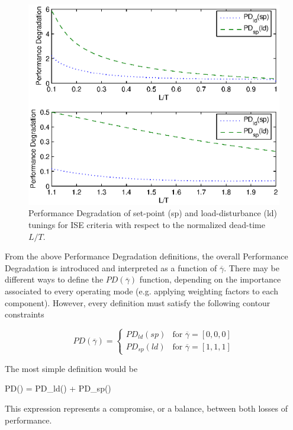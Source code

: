 \begin{figure}[h!]
    \begin{center}
        \includegraphics[width=0.8\linewidth]{PerfDeg.eps}
        \caption{Performance Degradation of set-point (sp) and load-disturbance (ld) tunings for ISE criteria with respect to the
        normalized dead-time $L/T$.}
        \label{PerfDegradation}
    \end{center}
\end{figure}

From the above Performance Degradation definitions, the overall
Performance Degradation is introduced and interpreted as a
function of $\overline{\gamma}$. There may be different ways to
define the $PD(\overline{\gamma})$ function, depending on the
importance associated to every operating mode (e.g. applying
weighting factors to each component). However, every definition
must satisfy the following contour constraints

\begin{displaymath}
PD(\overline{\gamma}) = \left \{ \begin{array}{ll} PD_{ld}(sp) &
\textrm{for  $\overline{\gamma}=\left[0,
0, 0 \right]$}\\
PD_{sp}(ld) & \textrm{for  $\overline{\gamma}=\left[1, 1, 1
\right]$}
\end{array} \right.
\end{displaymath}

The most simple definition would be

\be PD(\overline{\gamma}) = PD_{ld}(\overline{\gamma}) +
PD_{sp}(\overline{\gamma}) \label{global_pd} \ee

This expression represents a compromise, or a balance, between
both losses of performance.


